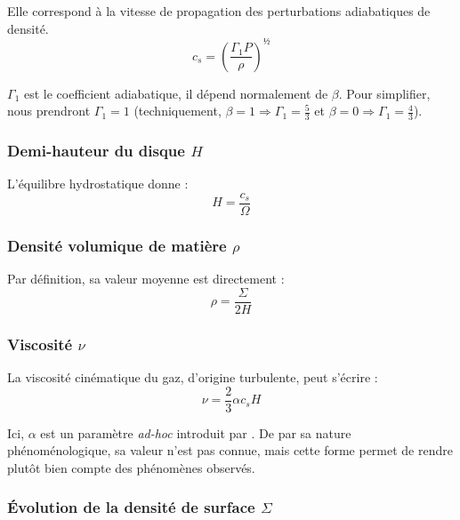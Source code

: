 Elle correspond à la vitesse de propagation des perturbations adiabatiques de densité.
\begin{equation}
    \label{eq:vitesse_son}
    c_s = \left( \frac{\Gamma_{\num{1}} P}{\rho} \right)^½
\end{equation}

$\Gamma_{\num{1}}$ est le coefficient adiabatique, il dépend normalement de
$\beta$. Pour simplifier, nous prendront $\Gamma_{\num{1}} = \num{1}$
(techniquement, $\beta = \num{1} \Rightarrow \Gamma_{\num{1}} =
\frac{\num{5}}{\num{3}}$ et $\beta = \num{0} \Rightarrow \Gamma_{\num{1}} =
\frac{\num{4}}{\num{3}}$).

\subsubsection{\texorpdfstring{Demi-hauteur du disque $H$}{Demi-hauteur du disque H}}

L’équilibre hydrostatique donne :
\begin{equation}
    \label{eq:hauteur}
    H = \frac{c_s}{\Omega}
\end{equation}

\subsubsection{\texorpdfstring{Densité volumique de matière $\rho$}{Densité volumique de matière ρ}}

Par définition, sa valeur moyenne est directement :
\begin{equation}
    \label{eq:densite}
    \rho = \frac{\Sigma}{\num{2} H}
\end{equation}

\subsubsection{\texorpdfstring{Viscosité $\nu$}{Viscosité ν}}

La viscosité cinématique du gaz, d’origine turbulente, peut s’écrire :
\begin{equation}
    \label{eq:viscosite}
    \nu = \frac{\num{2}}{\num{3}} \alpha c_s H
\end{equation}

Ici, $\alpha$ est un paramètre \textit{ad-hoc} introduit par \citet{1973}. De
par sa nature phénoménologique, sa valeur n’est pas connue, mais cette forme
permet de rendre plutôt bien compte des phénomènes observés.

\subsubsection{\texorpdfstring{Évolution de la densité de surface $\Sigma$}{Évolution de la densité de surface Σ}}

